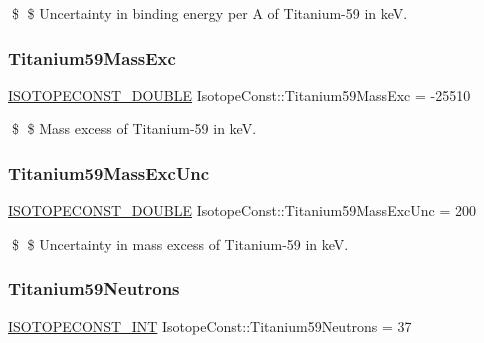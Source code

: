 \$ \$ Uncertainty in binding energy per A of Titanium-\/59 in keV. \mbox{\label{group___isotope_const-_titanium-_ti59_ga468e0ef0f43503ca2e44df49ca98ec9e}} 
\subsubsection{\texorpdfstring{Titanium59\+Mass\+Exc}{Titanium59MassExc}}
{\footnotesize\ttfamily \mbox{\hyperlink{group___isotope_const-_macros_ga8f45a7272ce02c0b4c65c44636ed719a}{I\+S\+O\+T\+O\+P\+E\+C\+O\+N\+S\+T\+\_\+\+D\+O\+U\+B\+LE}} Isotope\+Const\+::\+Titanium59\+Mass\+Exc = -\/25510}

\$ \$ Mass excess of Titanium-\/59 in keV. \mbox{\label{group___isotope_const-_titanium-_ti59_ga3a2e5b8eefce4d58547da1b321af5f33}} 
\subsubsection{\texorpdfstring{Titanium59\+Mass\+Exc\+Unc}{Titanium59MassExcUnc}}
{\footnotesize\ttfamily \mbox{\hyperlink{group___isotope_const-_macros_ga8f45a7272ce02c0b4c65c44636ed719a}{I\+S\+O\+T\+O\+P\+E\+C\+O\+N\+S\+T\+\_\+\+D\+O\+U\+B\+LE}} Isotope\+Const\+::\+Titanium59\+Mass\+Exc\+Unc = 200}

\$ \$ Uncertainty in mass excess of Titanium-\/59 in keV. \mbox{\label{group___isotope_const-_titanium-_ti59_ga63250d05201d2e21548c73a73bf74653}} 
\subsubsection{\texorpdfstring{Titanium59\+Neutrons}{Titanium59Neutrons}}
{\footnotesize\ttfamily \mbox{\hyperlink{group___isotope_const-_macros_ga5f18360b3e99483a35c32d789e62621c}{I\+S\+O\+T\+O\+P\+E\+C\+O\+N\+S\+T\+\_\+\+I\+NT}} Isotope\+Const\+::\+Titanium59\+Neutrons = 37}

